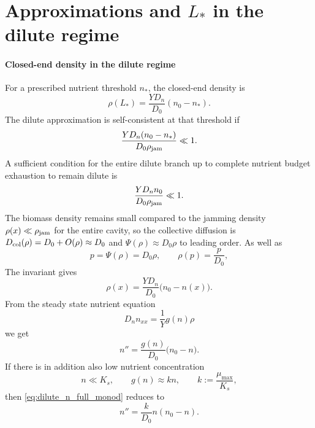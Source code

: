 \documentclass[11pt,a4paper]{report}
\begin{document}
\section{Approximations and $L_*$ in the dilute regime}
\label{dilute}
\paragraph{Closed-end density in the dilute regime}
For a prescribed nutrient threshold $n_*$, the closed-end density is
\begin{equation}
	{
		\rho(L_*)
		=
		\frac{YD_n}{D_0}(n_0-n_*).
	}
	\label{eq:rhoL_dilute_threshold}
\end{equation}
The dilute approximation is self-consistent at that threshold if
\begin{equation}
	{
		\frac{YD_n(n_0-n_*)}{D_0\rho_{\rm jam}}\ll1.
	}
	\label{eq:dilute_threshold_self_consistency}
\end{equation}
A sufficient condition for the entire dilute branch up to complete nutrient
budget exhaustion to remain dilute is
\begin{equation}
	{
		\frac{YD_n n_0}{D_0\rho_{\rm jam}}\ll1.
	}
	\label{eq:dilute_global_self_consistency}
\end{equation}
The biomass density remains small compared to the jamming density $\rho(x)\ll \rho_{\rm jam}$ for the entire cavity, so the collective diffusion is $D_{\rm col}(\rho)=D_0+O(\rho)\approx D_0$ and $\Psi(\rho)\approx D_0\rho$ to leading order. As well as \begin{equation}
	p=\Psi(\rho)=D_0\rho,
	\qquad
	\rho(p)=\frac{p}{D_0},
\end{equation}
The invariant gives 
\begin{equation}
	{
		\rho(x)=\frac{YD_n}{D_0}\bigl(n_0-n(x)\bigr).
	}
	\label{eq:dilute_rho_n}
\end{equation}
From the steady state nutrient equation
\begin{equation}
	D_n n_{xx}=\frac{1}{Y}g(n)\rho
\end{equation}
we get
\begin{equation}
	{
		n''=\frac{g(n)}{D_0}\bigl(n_0-n\bigr).
	}
	\label{eq:dilute_n_full_monod}
\end{equation}
If there is in addition also low nutrient concentration
\begin{equation}
	n\ll K_s,
	\qquad
	g(n)\approx kn,
	\qquad
	k:=\frac{\mu_{\max}}{K_s},
	\label{eq:dilute_A1}
\end{equation}
then \eqref{eq:dilute_n_full_monod} reduces to
\begin{equation}
	{
		n''=\frac{k}{D_0}n(n_0-n).
	}
	\label{eq:dilute_n_logistic}
\end{equation}
\end{document}
